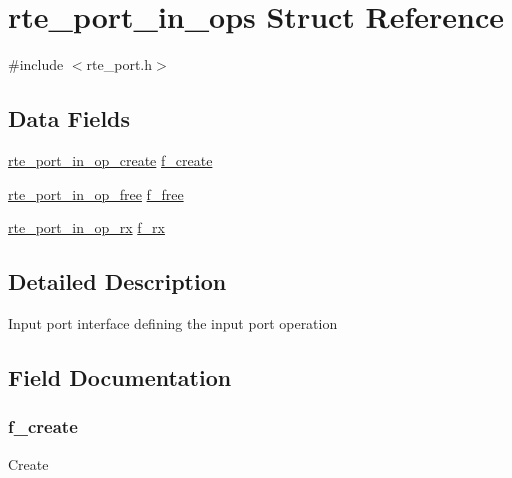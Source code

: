 \hypertarget{structrte__port__in__ops}{}\section{rte\+\_\+port\+\_\+in\+\_\+ops Struct Reference}
\label{structrte__port__in__ops}


{\ttfamily \#include $<$rte\+\_\+port.\+h$>$}

\subsection*{Data Fields}
\begin{DoxyCompactItemize}
\item 
\hyperlink{rte__port_8h_abfeb87bc582287f9f52e77da510f8c79}{rte\+\_\+port\+\_\+in\+\_\+op\+\_\+create} \hyperlink{structrte__port__in__ops_af3206fe3cd8947bd028a5fed13227b5d}{f\+\_\+create}
\item 
\hyperlink{rte__port_8h_a250d65d64b4d6481033edca16d630ead}{rte\+\_\+port\+\_\+in\+\_\+op\+\_\+free} \hyperlink{structrte__port__in__ops_a06fe0cfe57dda6c925889719283fdec4}{f\+\_\+free}
\item 
\hyperlink{rte__port_8h_aff8e1a526e24daae389c64d0b89dfcd5}{rte\+\_\+port\+\_\+in\+\_\+op\+\_\+rx} \hyperlink{structrte__port__in__ops_a33a5d93578273b6bc577f89c86643c55}{f\+\_\+rx}
\end{DoxyCompactItemize}


\subsection{Detailed Description}
Input port interface defining the input port operation 

\subsection{Field Documentation}
\hypertarget{structrte__port__in__ops_af3206fe3cd8947bd028a5fed13227b5d}{}
\subsubsection[{f\+\_\+create}]{ f\+\_\+create}\label{structrte__port__in__ops_af3206fe3cd8947bd028a5fed13227b5d}
Create \hypertarget{structrte__port__in__ops_a06fe0cfe57dda6c925889719283fdec4}{}
